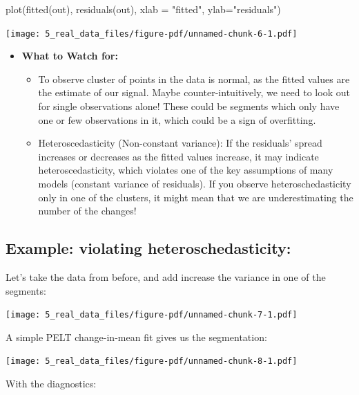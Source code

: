 \documentclass[
  letterpaper,
  DIV=11,
  numbers=noendperiod]{scrreprt}
\newenvironment{Shaded}{\begin{snugshade}}{\end{snugshade}}
\newcommand{\AttributeTok}[1]{\textcolor[rgb]{0.40,0.45,0.13}{#1}}
\newcommand{\FunctionTok}[1]{\textcolor[rgb]{0.28,0.35,0.67}{#1}}
\newcommand{\NormalTok}[1]{\textcolor[rgb]{0.00,0.23,0.31}{#1}}
\newcommand{\StringTok}[1]{\textcolor[rgb]{0.13,0.47,0.30}{#1}}
\providecommand{\tightlist}{%
  \setlength{\itemsep}{0pt}\setlength{\parskip}{0pt}}\usepackage{longtable,booktabs,array}
\begin{document}
\begin{Shaded}
\begin{Highlighting}[]
\FunctionTok{plot}\NormalTok{(}\FunctionTok{fitted}\NormalTok{(out), }\FunctionTok{residuals}\NormalTok{(out), }\AttributeTok{xlab =} \StringTok{"fitted"}\NormalTok{, }\AttributeTok{ylab=}\StringTok{"residuals"}\NormalTok{)}
\end{Highlighting}
\end{Shaded}

\texttt{[image: 5\_real\_data\_files/figure-pdf/unnamed-chunk-6-1.pdf]}

\begin{itemize}
\tightlist
\item
  \textbf{What to Watch for:}

  \begin{itemize}
  \tightlist
  \item
    To observe cluster of points in the data is normal, as the fitted
    values are the estimate of our signal. Maybe counter-intuitively, we
    need to look out for single observations alone! These could be
    segments which only have one or few observations in it, which could
    be a sign of overfitting.
  \item
    Heteroscedasticity (Non-constant variance): If the residuals' spread
    increases or decreases as the fitted values increase, it may
    indicate heteroscedasticity, which violates one of the key
    assumptions of many models (constant variance of residuals). If you
    observe heteroschedasticity only in one of the clusters, it might
    mean that we are underestimating the number of the changes!
  \end{itemize}
\end{itemize}

\subsection{Example: violating
heteroschedasticity:}\label{example-violating-heteroschedasticity}

Let's take the data from before, and add increase the variance in one of
the segments:

\texttt{[image: 5\_real\_data\_files/figure-pdf/unnamed-chunk-7-1.pdf]}

A simple PELT change-in-mean fit gives us the segmentation:

\texttt{[image: 5\_real\_data\_files/figure-pdf/unnamed-chunk-8-1.pdf]}

With the diagnostics:
\end{document}
